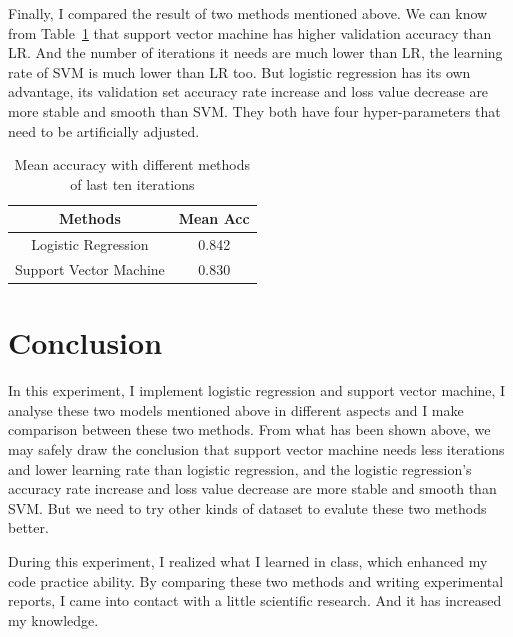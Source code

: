 \documentclass[journal, a4paper]{IEEEtran}
\begin{document}
Finally, I compared the result of two methods mentioned above. We can know from Table~\ref{tab:acc} that support vector machine has higher validation accuracy than LR. And the number of iterations it needs are much lower than LR, the learning rate of SVM is much lower than LR too. But logistic regression has its own advantage, its validation set accuracy rate increase and loss value decrease are more stable and smooth than SVM. They both have four hyper-parameters that need to be artificially adjusted.

	\begin{table}[!hbt]
		\begin{center}
		\caption{Mean accuracy with different methods of last ten iterations}
		\label{tab:acc}
		\begin{tabular}{|c|c|}
			\hline
			Methods & Mean Acc \\
			\hline
			Logistic Regression & 0.842 \\
			\hline
			Support Vector Machine & 0.830 \\
			\hline
		\end{tabular}
		\end{center}
	\end{table}
	
\section{Conclusion}

In this experiment, I implement logistic regression and support vector machine, I analyse these two models mentioned above in different aspects and I make comparison between these two methods. From what has been shown above, we may safely draw the conclusion that support vector machine needs less iterations and lower learning rate than logistic regression, and the logistic regression's accuracy rate increase and loss value decrease are more stable and smooth than SVM. But we need to try other kinds of dataset to evalute these two methods better.

During this experiment, I realized what I learned in class, which enhanced my code practice ability. By comparing these two methods and writing experimental reports, I came into contact with a little scientific research. And it has increased my knowledge.

\end{document}
